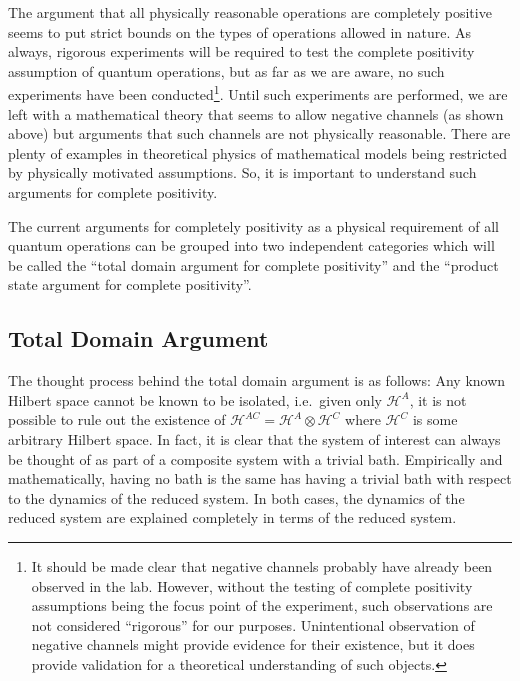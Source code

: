 The argument that all physically reasonable operations are completely positive seems to put strict bounds on the types of operations allowed in nature.  As always, rigorous experiments will be required to test the complete positivity assumption of quantum operations, but as far as we are aware, no such experiments have been conducted\footnote{It should be made clear that negative channels probably have already been observed in the lab.  However, without the testing of complete positivity assumptions being the focus point of the experiment, such observations are not considered ``rigorous'' for our purposes.  Unintentional observation of negative channels might provide evidence for their existence, but it does provide validation for a theoretical understanding of such objects.}.  Until such experiments are performed, we are left with a mathematical theory that seems to allow negative channels (as shown above) but arguments that such channels are not physically reasonable.  There are plenty of examples in theoretical physics of mathematical models being restricted by physically motivated assumptions.  So, it is important to understand such arguments for complete positivity.

The current arguments for completely positivity as a physical requirement of all quantum operations can be grouped into two independent categories which will be called the ``total domain argument for complete positivity'' and the ``product state argument for complete positivity''.

\subsection{Total Domain Argument}

The thought process behind the total domain argument is as follows: Any known Hilbert space cannot be known to be isolated, i.e.\ given only $\mathcal{H}^A$, it is not possible to rule out the existence of $\mathcal{H}^{AC} = \mathcal{H}^A \otimes \mathcal{H}^C$ where $\mathcal{H}^C$ is some arbitrary Hilbert space.  In fact, it is clear that the system of interest can always be thought of as part of a composite system with a trivial bath.  Empirically and mathematically, having no bath is the same has having a trivial bath with respect to the dynamics of the reduced system.  In both cases, the dynamics of the reduced system are explained completely in terms of the reduced system.


